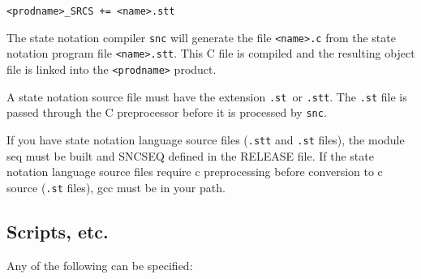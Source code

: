 \begin{verbatim}<prodname>_SRCS += <name>.stt
\end{verbatim}The state notation compiler \verb|snc| will generate the file \verb|<name>.c| from the state notation program file \verb|<name>.stt|. 
This C file is compiled and the resulting object file is linked into the \verb|<prodname>| product.

A state notation source file must have the extension \verb|.st |or \verb|.stt|. The \verb|.st| file is passed through the C preprocessor 
before it is processed by \verb|snc|.

If you have state notation language source files (\verb|.stt| and \verb|.st| files),  the module seq must be built and SNCSEQ defined 
in the RELEASE file. If the state notation language source files require c preprocessing before conversion to c source 
(\verb|.st| files), gcc must be in your path.

\subsection{Scripts, etc.}

Any of the following can be specified:

